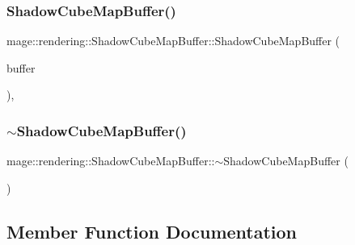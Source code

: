 \hypertarget{classmage_1_1rendering_1_1_shadow_cube_map_buffer_ac636a06f0001b7317ca252b06025ffc4}{}\label{classmage_1_1rendering_1_1_shadow_cube_map_buffer_ac636a06f0001b7317ca252b06025ffc4} 
\subsubsection{\texorpdfstring{Shadow\+Cube\+Map\+Buffer()}{ShadowCubeMapBuffer()}\hspace{0.1cm}{\footnotesize\ttfamily [3/3]}}
{\footnotesize\ttfamily mage\+::rendering\+::\+Shadow\+Cube\+Map\+Buffer\+::\+Shadow\+Cube\+Map\+Buffer (\begin{DoxyParamCaption}\item[{\hyperlink{classmage_1_1rendering_1_1_shadow_cube_map_buffer}{Shadow\+Cube\+Map\+Buffer} \&\&}]{buffer }\end{DoxyParamCaption})\hspace{0.3cm}{\ttfamily [default]}, {\ttfamily [noexcept]}}

\hypertarget{classmage_1_1rendering_1_1_shadow_cube_map_buffer_a674fdad641a8892821ff8e76d4f05a88}{}\label{classmage_1_1rendering_1_1_shadow_cube_map_buffer_a674fdad641a8892821ff8e76d4f05a88} 
\subsubsection{\texorpdfstring{$\sim$\+Shadow\+Cube\+Map\+Buffer()}{~ShadowCubeMapBuffer()}}
{\footnotesize\ttfamily mage\+::rendering\+::\+Shadow\+Cube\+Map\+Buffer\+::$\sim$\+Shadow\+Cube\+Map\+Buffer (\begin{DoxyParamCaption}{ }\end{DoxyParamCaption})\hspace{0.3cm}{\ttfamily [default]}}



\subsection{Member Function Documentation}
\hypertarget{classmage_1_1rendering_1_1_shadow_cube_map_buffer_a584f753f82c2378a8c7171bdf5a96999}{}\label{classmage_1_1rendering_1_1_shadow_cube_map_buffer_a584f753f82c2378a8c7171bdf5a96999} 
